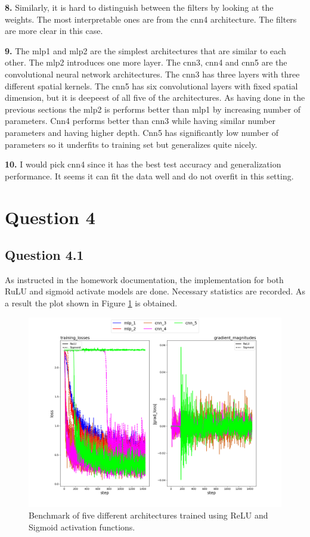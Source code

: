 \documentclass{assignment}
\begin{document}
\textbf{8.}
Similarly, it is hard to distinguish between the filters by looking at the weights. The most interpretable ones are from the cnn4 architecture. The filters are more clear in this case.

\textbf{9.}
The mlp1 and mlp2 are the simplest architectures that are similar to each other. The mlp2 introduces one more layer. The cnn3, cnn4 and cnn5 are the convolutional neural network architectures. The cnn3 has three layers with three different spatial kernels. The cnn5 has six convolutional layers with fixed spatial dimension, but it is deepeest of all five of the architectures. As having done in the previous sections the mlp2 is performs better than mlp1 by increasing number of parameters. Cnn4 performs better than cnn3 while having similar number parameters and having higher depth. Cnn5 has significantly low number of parameters so it underfits to training set but generalizes quite nicely.

\textbf{10.}
I would pick cnn4 since it has the best test accuracy and generalization performance. It seems it can fit the data well and do not overfit in this setting.

\section{Question 4}

\subsection{Question 4.1}
As instructed in the homework documentation, the implementation for both RuLU and sigmoid activate models are done. Necessary statistics are recorded. As a result the plot shown in Figure \ref{fig:q4} is obtained.

\begin{figure}[htbp!]
    \centering
    \includegraphics[width=1\textwidth]{figures/q4_plot.png}
    \caption{Benchmark of five different architectures trained using ReLU and Sigmoid activation functions.}
    \label{fig:q4}
\end{figure}
\end{document}
